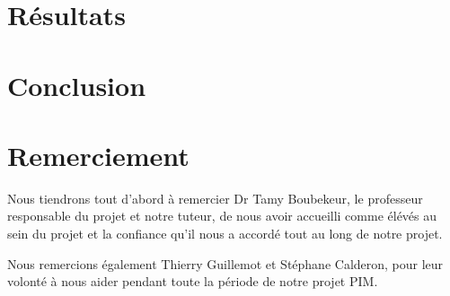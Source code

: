 \documentclass[a4paper,12pt]{article}
\begin{document}
\section{Résultats}

\section{Conclusion}

\section{Remerciement}
Nous tiendrons tout d’abord à remercier Dr Tamy Boubekeur, le
professeur responsable du projet et notre tuteur, de nous avoir
accueilli comme élévés au sein du projet et la confiance qu’il nous a
accordé tout au long de notre projet. 

Nous remercions également Thierry Guillemot et Stéphane Calderon, pour
leur volonté à nous aider pendant toute la période de notre projet PIM. 

\nocite{Beeler:2010:HSC:1778765.1778777}

\begin{small}
  
\end{small}
\section*{}
\end{document}
